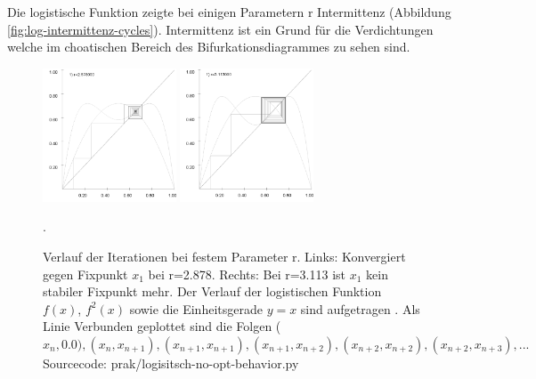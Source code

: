 \documentclass{scrartcl}
\begin{document}
Die logistische Funktion zeigte bei einigen Parametern r Intermittenz (Abbildung \ref{fig:log-intermittenz-cycles}). Intermittenz ist ein Grund für die Verdichtungen welche im choatischen Bereich des Bifurkationsdiagrammes zu sehen sind.

\begin{figure}[!htbp]
\centering
\includegraphics[height=150px]{fixpunkt-2878}
\includegraphics[height=150px]{fixpunkt-311}
\caption{Verlauf der Iterationen bei festem Parameter r. Links: Konvergiert gegen Fixpunkt $x_1$ bei r=2.878. Rechts: Bei r=3.113 ist $x_1$ kein stabiler Fixpunkt mehr. Der Verlauf der logistischen Funktion $f(x)$, $f^2(x)$ sowie die Einheitsgerade $y=x$ sind aufgetragen . Als Linie Verbunden geplottet sind die Folgen ($x_n, 0.0), (x_n, x_{n+1}), (x_{n+1}, x_{n+1}), (x_{n+1}, x_{n+2}), (x_{n+2}, x_{n+2}), (x_{n+2}, x_{n+3}), ...$ Sourcecode: prak/logisitsch-no-opt-behavior.py}. 
\label{fig:log-iteration-behavior}
\end{figure}
\end{document}
